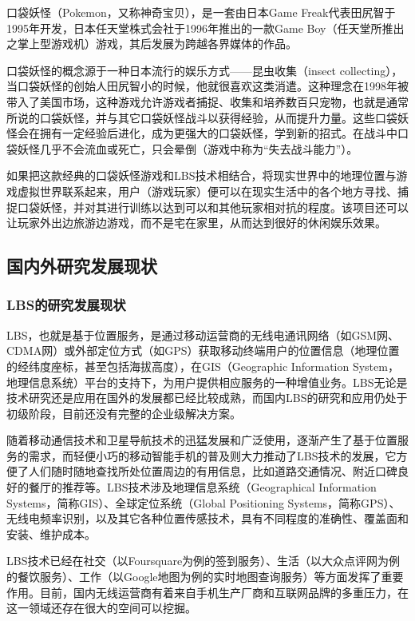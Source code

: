 \documentclass{article}
\begin{document}
\begin{CJK}{UTF8}{gbsn}
	口袋妖怪（Pokemon，又称神奇宝贝），是一套由日本Game Freak代表田尻智于1995年开发，日本任天堂株式会社于1996年推出的一款Game Boy（任天堂所推出之掌上型游戏机）游戏，其后发展为跨越各界媒体的作品。

  口袋妖怪的概念源于一种日本流行的娱乐方式——昆虫收集（insect collecting），当口袋妖怪的创始人田尻智小的时候，他就很喜欢这类消遣。这种理念在1998年被带入了美国市场，这种游戏允许游戏者捕捉、收集和培养数百只宠物，也就是通常所说的口袋妖怪，并与其它口袋妖怪战斗以获得经验，从而提升力量。这些口袋妖怪会在拥有一定经验后进化，成为更强大的口袋妖怪，学到新的招式。在战斗中口袋妖怪几乎不会流血或死亡，只会晕倒（游戏中称为“失去战斗能力”）。

	如果把这款经典的口袋妖怪游戏和LBS技术相结合，将现实世界中的地理位置与游戏虚拟世界联系起来，用户（游戏玩家）便可以在现实生活中的各个地方寻找、捕捉口袋妖怪，并对其进行训练以达到可以和其他玩家相对抗的程度。该项目还可以让玩家外出边旅游边游戏，而不是宅在家里，从而达到很好的休闲娱乐效果。

	\subsection{国内外研究发展现状}
	\subsubsection{LBS的研究发展现状}
  LBS，也就是基于位置服务，是通过移动运营商的无线电通讯网络（如GSM网、CDMA网）或外部定位方式（如GPS）获取移动终端用户的位置信息（地理位置的经纬度座标，甚至包括海拔高度），在GIS（Geographic Information System，地理信息系统）平台的支持下，为用户提供相应服务的一种增值业务。LBS无论是技术研究还是应用在国外的发展都已经比较成熟，而国内LBS的研究和应用仍处于初级阶段，目前还没有完整的企业级解决方案\cite{L06}。

   随着移动通信技术和卫星导航技术的迅猛发展和广泛使用，逐渐产生了基于位置服务的需求，而轻便小巧的移动智能手机的普及则大力推动了LBS技术的发展，它方便了人们随时随地查找所处位置周边的有用信息，比如道路交通情况、附近口碑良好的餐厅的推荐等。LBS技术涉及地理信息系统（Geographical Information Systems，简称GIS）、全球定位系统（Global Positioning Systems，简称GPS）、无线电频率识别，以及其它各种位置传感技术，具有不同程度的准确性、覆盖面和安装、维护成本\cite{L02}。

	LBS技术已经在社交（以Foursquare为例的签到服务）、生活（以大众点评网为例的餐饮服务）、工作（以Google地图为例的实时地图查询服务）等方面发挥了重要作用。目前，国内无线运营商有着来自手机生产厂商和互联网品牌的多重压力，在这一领域还存在很大的空间可以挖掘。


\end{CJK}
\end{document}

